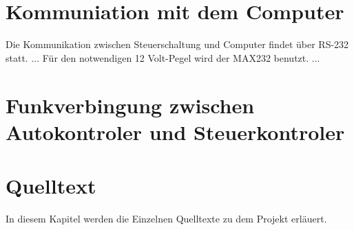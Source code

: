 \documentclass{scrartcl}
\begin{document}
\section{Kommuniation mit dem Computer} %
	Die Kommunikation zwischen Steuerschaltung und Computer findet über RS-232 statt.
	...
	Für den notwendigen 12 Volt-Pegel wird der MAX232 benutzt.
	...	

\section{Funkverbingung zwischen Autokontroler und Steuerkontroler} %

\section{Quelltext} %
	In diesem Kapitel werden die Einzelnen Quelltexte zu dem Projekt erläuert.
\end{document}
